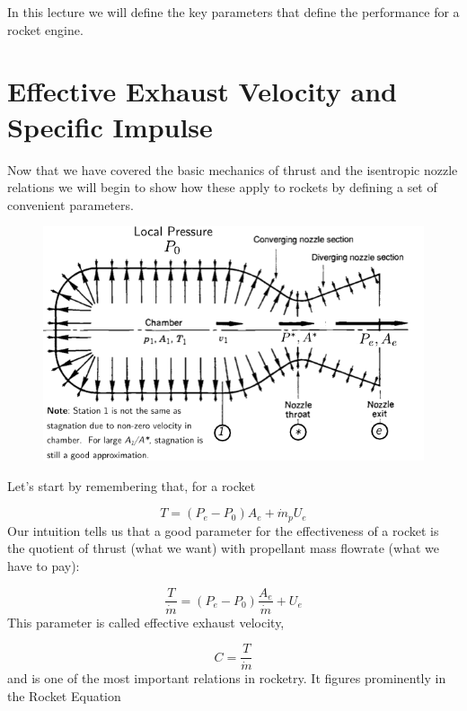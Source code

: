 \documentclass[twocolumn]{memoir} %
\begin{document}
In this lecture we will define the key parameters that define the performance for a rocket engine.

\section{Effective Exhaust Velocity and Specific Impulse}\label{c-and-isp}

Now that we have covered the basic mechanics of thrust and the
isentropic nozzle relations we will begin to show how these apply to
rockets by defining a set of convenient parameters.

\begin{figure}[H]
    \centering
    \includegraphics[width=0.95\columnwidth]{nozzle_pressure.pdf}
\end{figure}

Let's start by remembering that, for a rocket

\begin{equation}T = (P_e - P_0)A_e + \dot{m}_pU_e
\end{equation}
%
Our intuition tells us that a good parameter for the effectiveness of a
rocket is the quotient of thrust (what we want) with propellant mass
flowrate (what we have to pay):

\begin{equation}
    \frac{T}{\dot{m}} = (P_e - P_0)\frac{A_e}{\dot{m}} + U_e
    \label{eq:T_M}
\end{equation}
%
This parameter is called effective exhaust velocity,

\begin{equation}
    C = \frac{T}{\dot{m}}
\end{equation}
%
and is one of the most important relations in rocketry.
It figures prominently in the Rocket Equation
\end{document}
